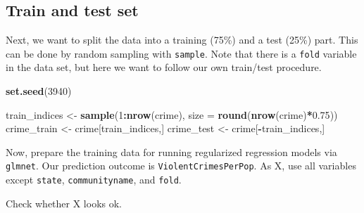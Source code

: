 \documentclass[
]{article}
\newenvironment{Shaded}{\begin{snugshade}}{\end{snugshade}}
\newcommand{\AttributeTok}[1]{\textcolor[rgb]{0.13,0.29,0.53}{#1}}
\newcommand{\DecValTok}[1]{\textcolor[rgb]{0.00,0.00,0.81}{#1}}
\newcommand{\FloatTok}[1]{\textcolor[rgb]{0.00,0.00,0.81}{#1}}
\newcommand{\FunctionTok}[1]{\textcolor[rgb]{0.13,0.29,0.53}{\textbf{#1}}}
\newcommand{\NormalTok}[1]{#1}
\newcommand{\OtherTok}[1]{\textcolor[rgb]{0.56,0.35,0.01}{#1}}
\newcommand{\SpecialCharTok}[1]{\textcolor[rgb]{0.81,0.36,0.00}{\textbf{#1}}}
\begin{document}
\hypertarget{train-and-test-set}{%
\subsection{Train and test set}\label{train-and-test-set}}

Next, we want to split the data into a training (75\%) and a test (25\%)
part. This can be done by random sampling with \texttt{sample}. Note
that there is a \texttt{fold} variable in the data set, but here we want
to follow our own train/test procedure.

\begin{Shaded}
\begin{Highlighting}[]
\FunctionTok{set.seed}\NormalTok{(}\DecValTok{3940}\NormalTok{)}

\NormalTok{train\_indices }\OtherTok{\textless{}{-}} \FunctionTok{sample}\NormalTok{(}\DecValTok{1}\SpecialCharTok{:}\FunctionTok{nrow}\NormalTok{(crime),}
                        \AttributeTok{size =} \FunctionTok{round}\NormalTok{(}\FunctionTok{nrow}\NormalTok{(crime)}\SpecialCharTok{*}\FloatTok{0.75}\NormalTok{))}
\NormalTok{crime\_train }\OtherTok{\textless{}{-}}\NormalTok{ crime[train\_indices,]}
\NormalTok{crime\_test }\OtherTok{\textless{}{-}}\NormalTok{ crime[}\SpecialCharTok{{-}}\NormalTok{train\_indices,]}
\end{Highlighting}
\end{Shaded}

Now, prepare the training data for running regularized regression models
via \texttt{glmnet}. Our prediction outcome is
\texttt{ViolentCrimesPerPop}. As X, use all variables except
\texttt{state}, \texttt{communityname}, and \texttt{fold}.

\begin{Shaded}
\end{Shaded}

Check whether X looks ok.
\end{document}
